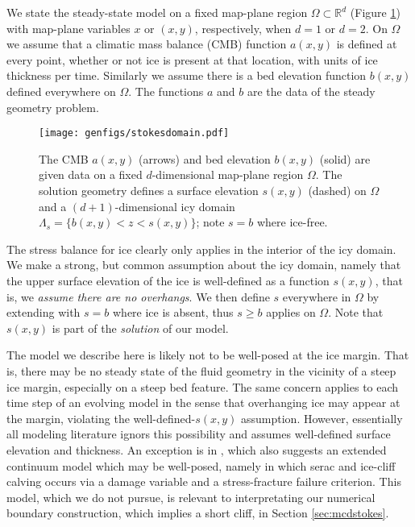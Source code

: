 \documentclass[letterpaper,final,12pt,reqno]{amsart}
\theoremstyle{claim}
\newcommand{\RR}{\mathbb{R}}
\numberwithin{equation}{section}
\numberwithin{figure}{section}
\numberwithin{table}{section}
\numberwithin{theorem}{section}
\begin{document}
We state the steady-state model on a fixed map-plane region $\Omega \subset \RR^d$ (Figure \ref{fig:stokesdomain}) with map-plane variables $x$ or $(x,y)$, respectively, when $d=1$ or $d=2$.  On $\Omega$ we assume that a climatic mass balance (CMB) function $a(x,y)$ is defined at every point, whether or not ice is present at that location, with units of ice thickness per time.  Similarly we assume there is a bed elevation function $b(x,y)$ defined everywhere on $\Omega$.  The functions $a$ and $b$ are the data of the steady geometry problem.

\begin{figure}[ht]
\begin{center}
\texttt{[image: genfigs/stokesdomain.pdf]}
\end{center}
\caption{The CMB $a(x,y)$ (arrows) and bed elevation $b(x,y)$ (solid) are given data on a fixed $d$-dimensional map-plane region $\Omega$.  The solution geometry defines a surface elevation $s(x,y)$ (dashed) on $\Omega$ and a $(d+1)$-dimensional icy domain $\Lambda_s = \{b(x,y) < z < s(x,y)\}$; note $s=b$ where ice-free.}
\label{fig:stokesdomain}
\end{figure}

The stress balance for ice clearly only applies in the interior of the icy domain.  We make a strong, but common \cite[for example]{IsaacStadlerGhattas2015,Jouvetetal2008,Lengetal2012,WirbelJarosch2020} assumption about the icy domain, namely that the upper surface elevation of the ice is well-defined as a function $s(x,y)$, that is, we \emph{assume there are no overhangs}.  We then define $s$ everywhere in $\Omega$ by extending with $s=b$ where ice is absent, thus $s\ge b$ applies on $\Omega$.  Note that $s(x,y)$ is part of the \emph{solution} of our model.

The model we describe here is likely not to be well-posed at the ice margin.  That is, there may be no steady state of the fluid geometry in the vicinity of a steep ice margin, especially on a steep bed feature.  The same concern applies to each time step of an evolving model in the sense that overhanging ice may appear at the margin, violating the well-defined-$s(x,y)$ assumption.  However, essentially all modeling literature ignors this possibility and assumes well-defined surface elevation and thickness.  An exception is in \cite{PralongFunk2005}, which also suggests an extended continuum model which may be well-posed, namely in which serac and ice-cliff calving occurs via a damage variable and a stress-fracture failure criterion.  This model, which we do not pursue, is relevant to interpretating our numerical boundary construction, which implies a short cliff, in Section \ref{sec:mcdstokes}.
\end{document}
